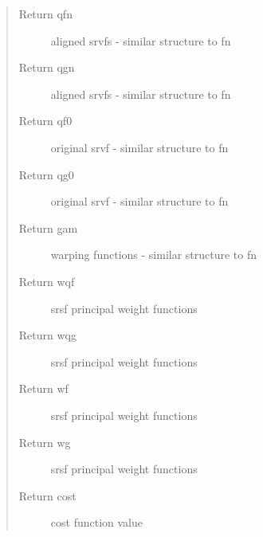 \documentclass[letterpaper,10pt,english]{sphinxmanual}
\begin{document}
\begin{fulllineitems}
\begin{quote}
\begin{description}
\item[{Return qfn}] \leavevmode
aligned srvfs - similar structure to fn

\item[{Return qgn}] \leavevmode
aligned srvfs - similar structure to fn

\item[{Return qf0}] \leavevmode
original srvf - similar structure to fn

\item[{Return qg0}] \leavevmode
original srvf - similar structure to fn

\item[{Return gam}] \leavevmode
warping functions - similar structure to fn

\item[{Return wqf}] \leavevmode
srsf principal weight functions

\item[{Return wqg}] \leavevmode
srsf principal weight functions

\item[{Return wf}] \leavevmode
srsf principal weight functions

\item[{Return wg}] \leavevmode
srsf principal weight functions

\item[{Return cost}] \leavevmode
cost function value

\end{description}\end{quote}

\end{fulllineitems}

\end{document}
